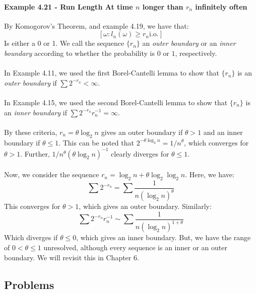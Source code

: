 \documentclass[12pt,a4paper]{article}
\newcommand{\1}[1]{\mathbbm{1}\left\{ #1 \right\}}
\newcommand{\io}{\text{i.o.}}
\begin{document}
\paragraph{Example 4.21 - Run Length At time $n$ longer than $r_n$ infinitely often} By Komogorov's Theorem, and example 4.19, we have that:
$$
	[\omega : l_n(\omega) \geq r_n \io]
$$
Is either a 0 or 1. We call the sequence $\{r_n\}$ an \textit{outer boundary} or an \textit{inner boundary} according to whether the probability is $0$ or $1$, respectively.
\\\\
In Example 4.11, we used the first Borel-Cantelli lemma to show that $\{r_n\}$ is an \textit{outer boundary} if $\sum 2^{-r_n} < \infty$.
\\\\
In Example 4.15, we used the second Borel-Cantelli lemma to show that $\{r_n\}$ is an \textit{inner boundary} if $\sum 2^{-r_n}r_n^{-1} = \infty$.
\\\\
By these criteria, $r_n = \theta \log_2 n$ gives an outer boundary if $\theta > 1$ and an inner boundary if $\theta \leq 1$. This can be noted that $2^{-\theta \log_2 n} = 1/n^\theta$, which converges for $\theta > 1$. Further, $1/n^\theta (\theta\log_2 n)^{-1}$ clearly diverges for $\theta \leq 1$. 
\\\\
Now, we consider the sequence $r_n = \log_2 n + \theta \log_2\log_2 n$. Here, we have:
$$
	\sum 2^{-r_n} = \sum \frac{1}{n(\log_2 n)^\theta}
$$
This converges for $\theta > 1$, which gives an outer boundary. Similarly:
$$
	\sum 2^{-r_n}r_n^{-1} \sim \sum \frac{1}{n(\log_2 n)^{1 + \theta}}
$$
Which diverges if $\theta \leq 0$, which gives an inner boundary. But, we have the range of $0 < \theta \leq 1$ unresolved, although every sequence is an inner or an outer boundary. We will revisit this in Chapter 6.

\subsection{Problems}
\end{document}
